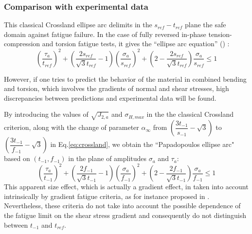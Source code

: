 \subsubsection{Comparison with experimental data}
This classical Crossland ellipse arc delimits in the $s_{ref}-t_{ref}$  plane the safe domain against fatigue failure. In the case of fully reversed in-phase tension-compression and torsion fatigue tests, it gives the ``ellipse arc equation'' (\cite{Papadopoulos1996513}) :
\begin{equation}
	\left( \dfrac{\tau_a}{t_{ref}}\right) ^2+\left( \dfrac{2s_{ref}}{\sqrt{3}t_{ref}}-1\right) \left( \dfrac{\sigma_a}{s_{ref}}\right) ^2+\left( 2-\dfrac{2s_{ref}}{\sqrt{3}t_{ref}}\right) \dfrac{\sigma_a}{s_{ref}}\leqslant 1
	\label{crossland}
\end{equation}

However, if one tries to predict the behavior of the material in combined bending and torsion, which involves  the gradients of normal and shear stresses, high discrepancies between predictions and experimental data will be found. 

By introducing the values of $\sqrt{J_{2,a}}$ and $\sigma_{H,max}$ in the the classical Crossland criterion, along with the change of parameter $\alpha_\infty$  from $\left(\dfrac{3 t_{-1}}{s_{-1}}-\sqrt{3}\right)$ to $\left(\dfrac{3 t_{-1}}{f_{-1}}-\sqrt{3}\right)$ in Eq.\eqref{eq:crossland}, we obtain the ``Papadopoulos ellipse arc" based on $\left(t_{-1},f_{-1} \right) $ in the plane of amplitudes $\sigma_a$ and $\tau_a$:
\begin{equation}
	\left(\dfrac{\tau_a}{t_{-1}}\right)^2+\left(\dfrac{2f_{-1}}{\sqrt{3}t_{-1}}-1\right)\left(\dfrac{\sigma_a}{f_{-1}}\right)^2+\left(2-\dfrac{2f_{-1}}{\sqrt{3}t_{-1}}\right)\dfrac{\sigma_a}{f_{-1}}\leqslant 1
	\label{papa}
\end{equation}
This apparent size effect, which is actually a gradient effect, in taken
into account intrinsically by gradient fatigue criteria, as for instance
proposed in \cite{Papadopoulos1996513}. Nevertheless, these criteria do not take into account the possible dependence of the fatigue limit on the shear
stress gradient and consequently do not distinguish between $t_{-1}$
and $t_{ref}$.

